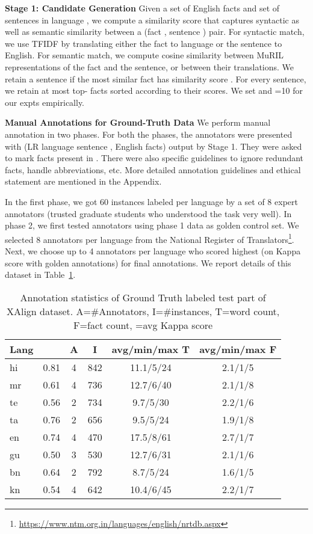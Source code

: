 \documentclass[11pt]{article}
\begin{document}
\noindent\textbf{Stage 1: Candidate Generation}
Given a set of English facts  and set of sentences  in language , we compute a similarity score that captures syntactic as well as semantic similarity between a (fact , sentence ) pair.
For syntactic match, we use TFIDF by translating either the fact to language  or the sentence to English. For semantic match, we compute cosine similarity between MuRIL~\cite{khanuja2021muril} representations of the fact and the sentence, or between their translations. We retain a sentence if the most similar fact has similarity score . For every sentence, we retain at most top- facts sorted according to their scores. We set  and =10 for our expts empirically.

\noindent\textbf{Manual Annotations for Ground-Truth Data}
We perform manual annotation in two phases. For both the phases, the annotators were presented with (LR language sentence ,  English facts) output by Stage 1. They were asked to mark facts present in . There were also specific guidelines to ignore redundant facts, handle abbreviations, etc. More detailed annotation guidelines and ethical statement are mentioned in the Appendix.


In the first phase, we got 60 instances labeled per language by a set of 8 expert annotators (trusted graduate students who understood the task very well). In phase 2, we first tested annotators using phase 1 data as golden control set. We selected 8 annotators per language from the National Register of Translators\footnote{\url{https://www.ntm.org.in/languages/english/nrtdb.aspx}}. Next, we choose up to 4 annotators per language who scored highest (on Kappa score with golden annotations) for final annotations. We report details of this dataset in Table~\ref{tab:annotationStats}. 

\begin{table}[!h]
    \centering
    \scriptsize
    \begin{tabular}{|l|c|c|c|c|c|}
    \hline
    Lang & &A&I&avg/min/max T&avg/min/max F\\
    \hline
    \hline
    hi&0.81&4&842&11.1/5/24&2.1/1/5\\
    \hline
    mr&0.61&4&736&12.7/6/40&2.1/1/8\\
    \hline
    te&0.56&2&734&9.7/5/30&2.2/1/6\\
    \hline
    ta&0.76&2&656&9.5/5/24&1.9/1/8\\
    \hline
    en&0.74&4&470&17.5/8/61&2.7/1/7\\
    \hline
    gu&0.50&3&530&12.7/6/31&2.1/1/6\\
    \hline
    bn&0.64&2&792&8.7/5/24&1.6/1/5\\
    \hline
    kn&0.54&4&642&10.4/6/45&2.2/1/7\\
    \hline
    \end{tabular}
    \caption{Annotation statistics of Ground Truth labeled test part of XAlign dataset. A=\#Annotators, I=\#instances, T=word count, F=fact count, =avg Kappa score}
    \label{tab:annotationStats}
\end{table}
\end{document}
